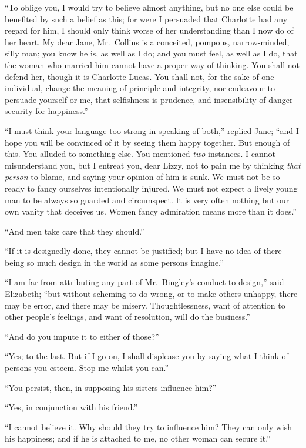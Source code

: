 \documentclass[12pt,english]{book}
\begin{document}
{}``To oblige you, I would try to believe almost anything, but no
one else could be benefited by such a belief as this; for were I persuaded
that Charlotte had any regard for him, I should only think worse of
her understanding than I now do of her heart. My dear Jane, Mr.\ Collins
is a conceited, pompous, narrow-minded, silly man; you know he is,
as well as I do; and you must feel, as well as I do, that the woman
who married him cannot have a proper way of thinking. You shall not
defend her, though it is Charlotte Lucas. You shall not, for the sake
of one individual, change the meaning of principle and integrity,
nor endeavour to persuade yourself or me, that selfishness is prudence,
and insensibility of danger security for happiness.''

{}``I must think your language too strong in speaking of both,''
replied Jane; {}``and I hope you will be convinced of it by seeing
them happy together. But enough of this. You alluded to something
else. You mentioned \textit{two} instances. I cannot misunderstand
you, but I entreat you, dear Lizzy, not to pain me by thinking \textit{that}
\textit{person} to blame, and saying your opinion of him is sunk.
We must not be so ready to fancy ourselves intentionally injured.
We must not expect a lively young man to be always so guarded and
circumspect. It is very often nothing but our own vanity that deceives
us. Women fancy admiration means more than it does.''

{}``And men take care that they should.''

{}``If it is designedly done, they cannot be justified; but I have
no idea of there being so much design in the world as some persons
imagine.''

{}``I am far from attributing any part of Mr.\ Bingley's conduct
to design,'' said Elizabeth; {}``but without scheming to do wrong,
or to make others unhappy, there may be error, and there may be misery.
Thoughtlessness, want of attention to other people's feelings, and
want of resolution, will do the business.''

{}``And do you impute it to either of those?''\ 

{}``Yes; to the last. But if I go on, I shall displease you by saying
what I think of persons you esteem. Stop me whilst you can.''

{}``You persist, then, in supposing his sisters influence him?''\ 

{}``Yes, in conjunction with his friend.''

{}``I cannot believe it. Why should they try to influence him? They
can only wish his happiness; and if he is attached to me, no other
woman can secure it.''
\end{document}
